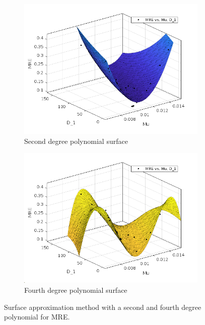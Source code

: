 \begin{figure}
    \centering
    \begin{subfigure}[b]{0.45\textwidth}
    \centering
    \includegraphics[width=\textwidth]{Images/ifem/MATLAB/MRE2poly.png}
    \caption{Second degree polynomial surface}
    \label{fig:poly2MRE}
    \end{subfigure}
    \hfill
    \begin{subfigure}[b]{0.45\textwidth}
    \centering
    \includegraphics[width=\textwidth]{Images/ifem/MATLAB/MRE4poly.png}
    \caption{Fourth degree polynomial surface}
    \label{fig:poly4MRE}
    \end{subfigure}
    \hspace{0.3cm}
    \caption[Polynomial approximation surfaces - MRE]{Surface approximation method with a second and fourth degree polynomial for MRE.}
    \label{fig:poly2and4MRE}
\end{figure}
